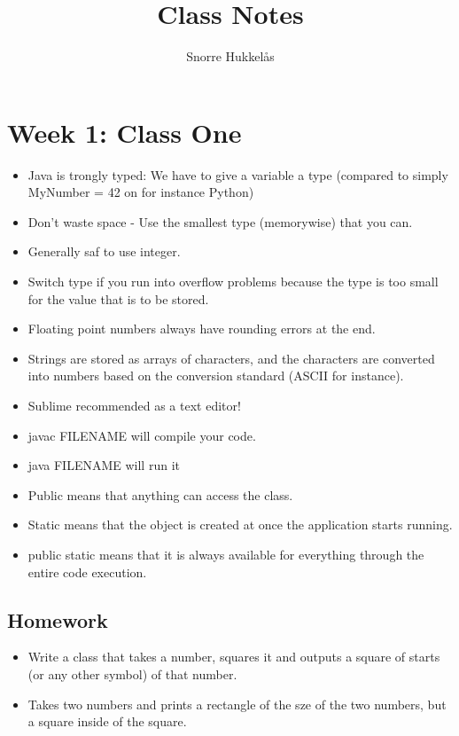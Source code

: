 \documentclass[]{article}
\title{Class Notes}
\author{Snorre Hukkelås}
\begin{document}
\maketitle


\section{ Week 1: Class One}

\begin{itemize}
	\item Java is trongly typed:  We have to give a variable a type (compared to simply MyNumber = 42 on for instance Python)
	\item Don't waste space - Use the smallest type (memorywise) that you can.
	\item Generally saf to use integer.
	\item Switch type if you run into overflow problems because the type is too small for the value that is to be stored.
	\item Floating point numbers always have rounding errors at the end.
	\item Strings are stored as arrays of characters, and the characters are converted into numbers based on the conversion standard (ASCII for instance).
	\item Sublime recommended as a text editor!
	\item javac FILENAME will compile your code.
	\item java FILENAME will run it
	\item Public means that anything can access the class.
	\item Static means that the object is created at once the application starts running.
	\item public static means that it is always available for everything through the entire code execution.
\end{itemize}

\subsection{Homework}
\begin{itemize}
	\item Write a class that takes a number, squares it and outputs a square of starts (or any other symbol) of that number.
	\item Takes two numbers and prints a rectangle of the sze of the two numbers, but a square inside of the square.
\end{itemize}
\end{document}

